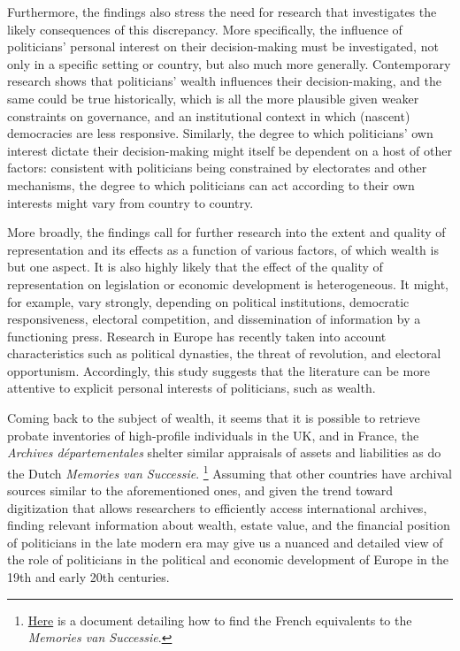     Furthermore, the findings also stress the need for research that investigates the likely consequences of this discrepancy. More specifically, the influence of politicians' personal interest on their decision-making must be investigated, not only in a specific setting or country, but also much more generally. Contemporary research shows that politicians' wealth influences their decision-making, and the same could be true historically, which is all the more plausible given weaker constraints on governance, and an institutional context in which (nascent) democracies are less responsive. \autocite{tahoun2019personal} Similarly, the  degree to which politicians' own interest dictate their decision-making might itself be dependent on a host of other factors: consistent with politicians being constrained by electorates and other mechanisms, the degree to which politicians can act according to their own interests might vary from country to country. \autocite{djankov2010disclosure}

    More broadly, the findings call for further research into the extent and quality of representation and its effects as a function of various factors, of which wealth is but one aspect. It is also highly likely that the effect of the quality of representation on legislation or economic development is heterogeneous. It might, for example, vary strongly, depending on political institutions, democratic responsiveness, electoral competition, and dissemination of information by a functioning press. Research in Europe has recently taken into account characteristics such as political dynasties, the threat of revolution, and electoral opportunism. \autocite{aidt2014workers, oosterlinck2020positive, aidt2019motivates} Accordingly, this study suggests that the literature can be more attentive to explicit personal interests of politicians, such as wealth. 

    Coming back to the subject of wealth, it seems that it is possible to retrieve probate inventories of high-profile individuals in the UK, and in France, the \textit{Archives départementales} shelter similar appraisals of assets and liabilities as do the Dutch \textit{Memories van Successie}. \autocite{bottomley2019returns} \footnote{\href{https://archives.cd08.fr/arkotheque/client/ad_ardennes/_depot_arko/articles/1834/tables-des-successions-et-absences-_doc.pdf}{Here} is a document detailing how to find the French equivalents to the \textit{Memories van Successie}.} Assuming that other countries have archival sources similar to the aforementioned ones, and given the trend toward digitization that allows researchers to efficiently access international archives, finding relevant information about wealth, estate value, and the financial position of politicians in the late modern era may give us a nuanced and detailed view of the role of politicians in the political and economic development of Europe in the 19th and early 20th centuries. 

